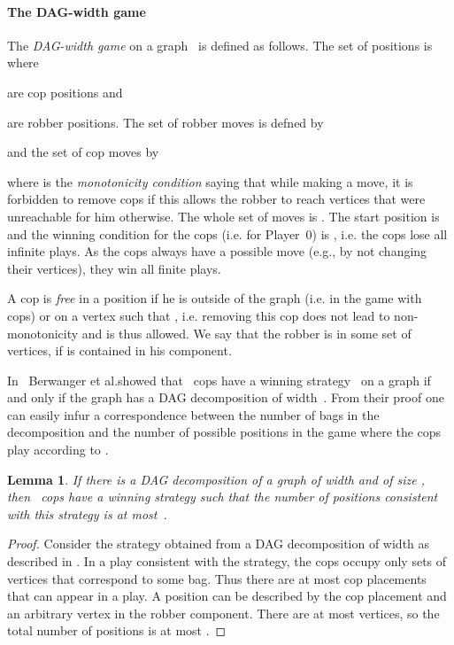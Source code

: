\documentclass[authoryear]{article}
\makeatletter
\newtheorem{lemma}[theorem]{Lemma}
\theoremstyle{definition}
\newcommand{\0}{\emptyset}
\newcommand{\dagw}{DAG-{}width\xspace}
\newcommand{\ie}{i.e.\@\xspace}
\newcommand{\eg}{e.g.,\xspace}
\makeatother
\begin{document}
\paragraph{The \dagw game} 
The \emph{\dagw game}  on a
graph~ is defined as follows. The set of positions is  where 
 
are cop positions and 

are robber positions. The set of robber moves is defned by 

and the set of cop moves by 

where 
is the \emph{monotonicity condition} saying that while making a move, it is forbidden 
to remove cops if this allows the robber to reach vertices that were unreachable for him 
otherwise. 
The whole set of moves is . 
The start position is  and the winning
condition for the cops (\ie for Player~0) is
, \ie the cops lose all infinite plays. 
As the cops always have a possible move (\eg by not changing their vertices), 
they win all finite plays. 

A cop is \emph{free} in a position  if he is outside of the
graph (\ie  in the game with  cops) or on 
a vertex  such that , \ie 
removing this cop does not lead to non-monotonicity and is thus allowed. We say
that the robber is in some set  of vertices, if  is contained in his component.



In~\cite{BerwangerDawHunKreObd12} Berwanger et al.\@ showed that~
cops have a winning strategy~ on a graph if and only if the graph has a
DAG decomposition of width~. From their proof one can easily infur
a correspondence between the number of bags in the decomposition and
the number of possible positions in the game where the cops play
according to .

\begin{lemma}\label{lemma:decs_and_positions}
If there is a DAG decomposition of a graph  of width  and of
size , then~ cops have a winning strategy such that the number
of positions consistent with this strategy is at most~.
\end{lemma}
\begin{proof}
  Consider the strategy obtained from a DAG
  decomposition of width  as described in \cite[Theorem
  16]{BerwangerDawHunKreObd12}. In a play consistent with the strategy, the
  cops occupy only sets of vertices that correspond to some bag. Thus
  there are at most  cop placements that can appear in a play. A
  position can be described by the cop placement and  an arbitrary vertex in the robber
  component. There are at most  vertices, so the total number of
  positions is at most .
\end{proof}
\end{document}
